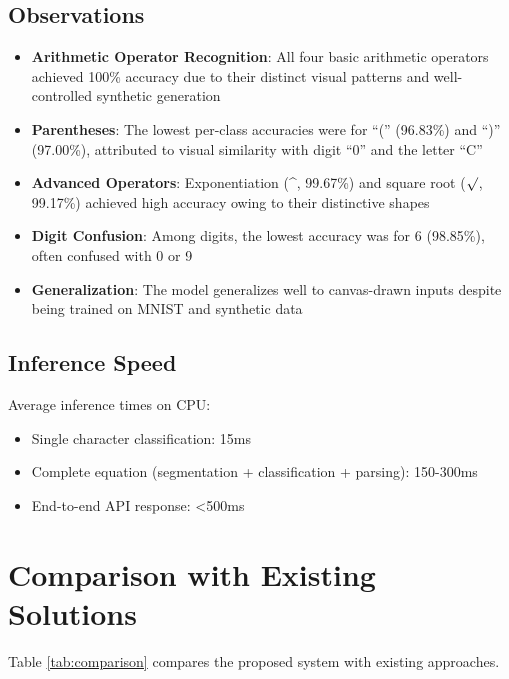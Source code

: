 \documentclass[conference]{IEEEtran}
\begin{document}
\subsection{Observations}

\begin{itemize}
    \item \textbf{Arithmetic Operator Recognition}: All four basic arithmetic operators achieved 100\% accuracy due to their distinct visual patterns and well-controlled synthetic generation
    \item \textbf{Parentheses}: The lowest per-class accuracies were for ``('' (96.83\%) and ``)'' (97.00\%), attributed to visual similarity with digit ``0'' and the letter ``C''
    \item \textbf{Advanced Operators}: Exponentiation (\^{}, 99.67\%) and square root ($\surd$, 99.17\%) achieved high accuracy owing to their distinctive shapes
    \item \textbf{Digit Confusion}: Among digits, the lowest accuracy was for 6 (98.85\%), often confused with 0 or 9
    \item \textbf{Generalization}: The model generalizes well to canvas-drawn inputs despite being trained on MNIST and synthetic data
\end{itemize}

\subsection{Inference Speed}

Average inference times on CPU:

\begin{itemize}
    \item Single character classification: 15ms
    \item Complete equation (segmentation + classification + parsing): 150-300ms
    \item End-to-end API response: <500ms
\end{itemize}

\section{Comparison with Existing Solutions}

Table \ref{tab:comparison} compares the proposed system with existing approaches.
\end{document}
